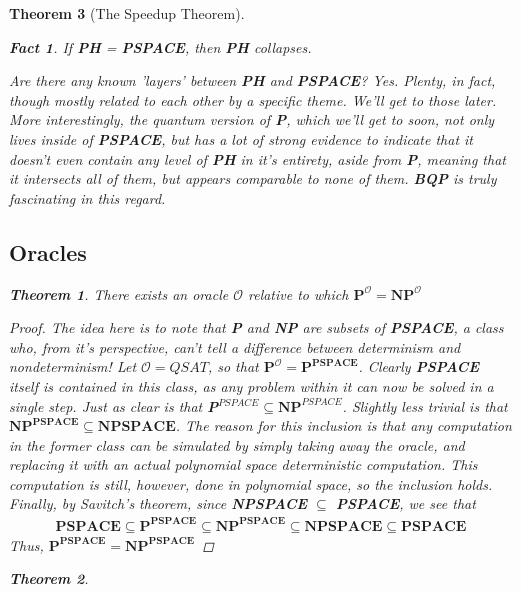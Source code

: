 \documentclass{article}
\theoremstyle{definition}
\theoremstyle{plain}
\theoremstyle{theorem}
\newtheorem{fact}{Fact}[section]
\newtheorem{theorem}{Theorem}[section]
\begin{document}
\begin{theorem}[The Speedup Theorem]
\begin{fact}
    If \textbf{PH} = \textbf{PSPACE}, then \textbf{PH} collapses.
\end{fact}
Are there any known 'layers' between \textbf{PH} and \textbf{PSPACE}? Yes. Plenty, in fact, though mostly related to each other by a specific theme. We'll get to those later. More interestingly, the \textit{quantum} version of \textbf{P}, which we'll get to soon, not only lives inside of \textbf{PSPACE}, but has a lot of strong evidence to indicate that it doesn't even contain \textit{any} level of \textbf{PH} in it's entirety, aside from \textbf{P}, meaning that it intersects all of them, but appears comparable to none of them. \textbf{BQP} is truly fascinating in this regard.
\subsection{Oracles}
\begin{theorem}
    There exists an oracle $\mathcal{O}$ relative to which $\textbf{P}^{\mathcal{O}} = \textbf{NP}^{\mathcal{O}}$
\end{theorem}
\begin{proof}
    The idea here is to note that \textbf{P} and \textbf{NP} are subsets of \textbf{PSPACE}, a class who, from it's perspective, can't tell a difference between determinism and nondeterminism! Let $\mathcal{O} = QSAT$, so that $\textbf{P}^{\mathcal{O}} = \textbf{P}^{\textbf{PSPACE}}$. Clearly \textbf{PSPACE} itself is contained in this class, as any problem within it can now be solved in a single step. Just as clear is that \textbf{P}$^{PSPACE} \subseteq \textbf{NP}^{PSPACE}$. Slightly less trivial is that $\textbf{NP}^{\textbf{PSPACE}} \subseteq \textbf{NPSPACE}$. The reason for this inclusion is that any computation in the former class can be simulated by simply taking away the oracle, and replacing it with an actual polynomial space deterministic computation. This computation is still, however, done in polynomial space, so the inclusion holds. Finally, by Savitch's theorem, since \textbf{NPSPACE} $\subseteq$ \textbf{PSPACE}, we see that
    \begin{align}
        \textbf{PSPACE} \subseteq \textbf{P}^{\textbf{PSPACE}} \subseteq \textbf{NP}^{\textbf{PSPACE}} \subseteq \textbf{NPSPACE} \subseteq \textbf{PSPACE}
    \end{align}
    Thus, $\textbf{P}^{\textbf{PSPACE}} = \textbf{NP}^{\textbf{PSPACE}}$
\end{proof}
\begin{theorem}

\end{theorem}
\end{theorem}
\end{document}
